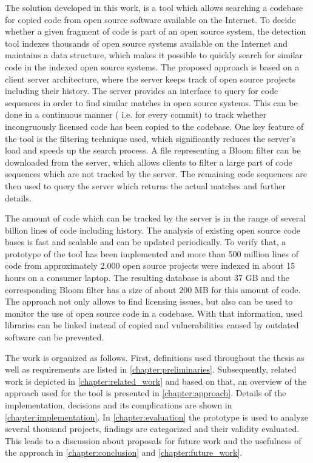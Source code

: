 The solution developed in this work, is a tool which allows searching a codebase for copied code from open source software available on the Internet.
To decide whether a given fragment of code is part of an open source system, the detection tool indexes thousands of open source systems available on the Internet and maintains a data structure, which makes it possible to quickly search for similar code in the indexed open source systems.
The proposed approach is based on a client server architecture, where the server keeps track of open source projects including their history.
The server provides an interface to query for code sequences in order to find similar matches in open source systems.
This can be done in a continuous manner ( i.e. for every commit) to track whether incongruously licensed code has been copied to the codebase.
One key feature of the tool is the filtering technique used, which significantly reduces the server's load and speeds up the search process.
A file representing a Bloom filter can be downloaded from the server, which allows clients to filter a large part of code sequences which are not tracked by the server.
The remaining code sequences are then used to query the server which returns the actual matches and further details.

The amount of code which can be tracked by the server is in the range of several billion lines of code including history.
The analysis of existing open source code bases is fast and scalable and can be updated periodically.
To verify that, a prototype of the tool has been implemented and more than 500 million lines of code from approximately 2.000 open source projects were indexed in about 15 hours on a consumer laptop.
The resulting database is about 37 GB and the corresponding Bloom filter has a size of about 200 MB for this amount of code.
The approach not only allows to find licensing issues, but also can be used to monitor the use of open source code in a codebase.
With that information, used libraries can be linked instead of copied and vulnerabilities caused by outdated software can be prevented.

The work is organized as follows.
First, definitions used throughout the thesis as well as requirements are listed in \autoref{chapter:preliminaries}.
Subsequently, related work is depicted in \autoref{chapter:related_work} and based on that, an overview of the approach used for the tool is presented in \autoref{chapter:approach}.
Details of the implementation, decisions and its complications are shown in \autoref{chapter:implementation}.
In \autoref{chapter:evaluation} the prototype is used to analyze several thousand projects, findings are categorized and their validity evaluated.
This leads to a discussion about proposals for future work and the usefulness of the approach in \autoref{chapter:conclusion} and \autoref{chapter:future_work}.